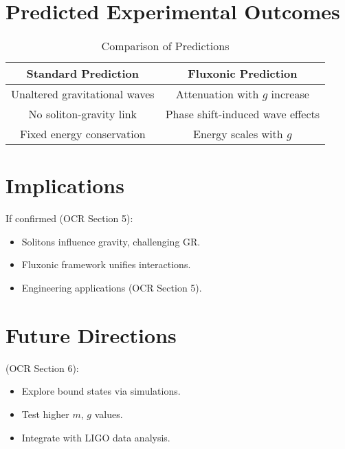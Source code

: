 \documentclass{article}
\begin{document}
\section{Predicted Experimental Outcomes}
\begin{table}[h]
    \centering
    \begin{tabular}{|c|c|}
        \hline
        \textbf{Standard Prediction} & \textbf{Fluxonic Prediction} \\
        \hline
        Unaltered gravitational waves & Attenuation with \(g\) increase \\
        No soliton-gravity link & Phase shift-induced wave effects \\
        Fixed energy conservation & Energy scales with \(g\) \\
        \hline
    \end{tabular}
    \caption{Comparison of Predictions}
    \label{tab:predictions}
\end{table}

\section{Implications}
If confirmed (OCR Section 5):
\begin{itemize}
    \item Solitons influence gravity, challenging GR.
    \item Fluxonic framework unifies interactions.
    \item Engineering applications (OCR Section 5).
\end{itemize}

\section{Future Directions}
(OCR Section 6):
\begin{itemize}
    \item Explore bound states via simulations.
    \item Test higher \(m\), \(g\) values.
    \item Integrate with LIGO data analysis.
\end{itemize}
\end{document}
